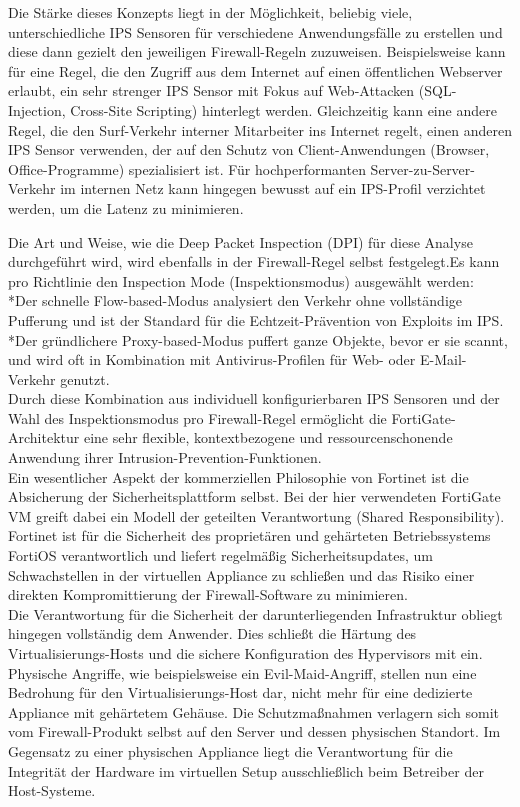 Die Stärke dieses Konzepts liegt in der Möglichkeit, beliebig viele, unterschiedliche IPS Sensoren für verschiedene Anwendungsfälle zu erstellen und diese dann gezielt den jeweiligen Firewall-Regeln zuzuweisen. Beispielsweise kann für eine Regel, die den Zugriff aus dem Internet auf einen öffentlichen Webserver erlaubt, ein sehr strenger IPS Sensor mit Fokus auf Web-Attacken (SQL-Injection, Cross-Site Scripting) hinterlegt werden. Gleichzeitig kann eine andere Regel, die den Surf-Verkehr interner Mitarbeiter ins Internet regelt, einen anderen IPS Sensor verwenden, der auf den Schutz von Client-Anwendungen (Browser, Office-Programme) spezialisiert ist. Für hochperformanten Server-zu-Server-Verkehr im internen Netz kann hingegen bewusst auf ein IPS-Profil verzichtet werden, um die Latenz zu minimieren.

Die Art und Weise, wie die Deep Packet Inspection (DPI) für diese Analyse durchgeführt wird, wird ebenfalls in der Firewall-Regel selbst festgelegt.Es kann pro Richtlinie den Inspection Mode (Inspektionsmodus) ausgewählt werden:\\

*Der schnelle Flow-based-Modus analysiert den Verkehr ohne vollständige Pufferung und ist der Standard für die Echtzeit-Prävention von Exploits im IPS.\\
*Der gründlichere Proxy-based-Modus puffert ganze Objekte, bevor er sie scannt, und wird oft in Kombination mit Antivirus-Profilen für Web- oder E-Mail-Verkehr genutzt.\\

Durch diese Kombination aus individuell konfigurierbaren IPS Sensoren und der Wahl des Inspektionsmodus pro Firewall-Regel ermöglicht die FortiGate-Architektur eine sehr flexible, kontextbezogene und ressourcenschonende Anwendung ihrer Intrusion-Prevention-Funktionen.\\

Ein wesentlicher Aspekt der kommerziellen Philosophie von Fortinet ist die Absicherung der Sicherheitsplattform selbst. Bei der hier verwendeten FortiGate VM greift dabei ein Modell der geteilten Verantwortung (Shared Responsibility). Fortinet ist für die Sicherheit des proprietären und gehärteten Betriebssystems FortiOS verantwortlich und liefert regelmäßig Sicherheitsupdates, um Schwachstellen in der virtuellen Appliance zu schließen und das Risiko einer direkten Kompromittierung der Firewall-Software zu minimieren.\\
Die Verantwortung für die Sicherheit der darunterliegenden Infrastruktur obliegt hingegen vollständig dem Anwender. Dies schließt die Härtung des Virtualisierungs-Hosts und die sichere Konfiguration des Hypervisors mit ein. Physische Angriffe, wie beispielsweise ein Evil-Maid-Angriff, stellen nun eine Bedrohung für den Virtualisierungs-Host dar, nicht mehr für eine dedizierte Appliance mit gehärtetem Gehäuse. Die Schutzmaßnahmen verlagern sich somit vom Firewall-Produkt selbst auf den Server und dessen physischen Standort. Im Gegensatz zu einer physischen Appliance liegt die Verantwortung für die Integrität der Hardware im virtuellen Setup ausschließlich beim Betreiber der Host-Systeme.

